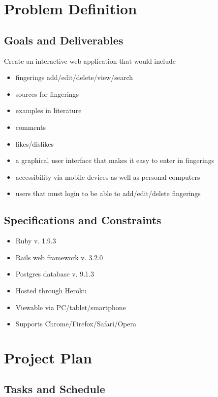 \documentclass[12pt,english]{article}
\begin{document}
\section{Problem Definition}


\subsection{Goals and Deliverables}

Create an interactive web application that would include 
\begin{itemize}
\item fingerings add/edit/delete/view/search 
\item sources for fingerings 
\item examples in literature 
\item comments 
\item likes/dislikes 
\item a graphical user interface that makes it easy to enter in fingerings 
\item accessibility via mobile devices as well as personal computers 
\item users that must login to be able to add/edit/delete fingerings 
\end{itemize}

\subsection{Specifications and Constraints}
\begin{itemize}
\item Ruby v. 1.9.3 
\item Rails web framework v. 3.2.0 
\item Postgres database v. 9.1.3 
\item Hosted through Heroku 
\item Viewable via PC/tablet/smartphone 
\item Supports Chrome/Firefox/Safari/Opera 
\end{itemize}

\section{Project Plan}


\subsection{Tasks and Schedule}
\end{document}
